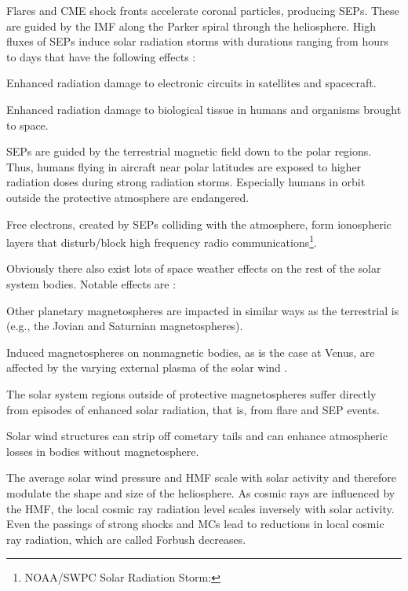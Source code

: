 Flares and CME shock fronts accelerate coronal particles, producing SEPs. These are guided by the IMF along the Parker spiral through the heliosphere. High fluxes of SEPs induce solar radiation storms with durations ranging from hours to days that have the following effects \citep{Bothmer2007}:
\begin{itemize*}
	\item Enhanced radiation damage to electronic circuits in satellites and spacecraft.
	\item Enhanced radiation damage to biological tissue in humans and organisms brought to space.
	\item SEPs are guided by the terrestrial magnetic field down to the polar regions. Thus, humans flying in aircraft near polar latitudes are exposed to higher radiation doses during strong radiation storms. Especially humans in orbit outside the protective atmosphere are endangered.
	\item Free electrons, created by SEPs colliding with the atmosphere, form ionospheric layers that disturb/block high frequency radio communications\footnote{NOAA/SWPC Solar Radiation Storm: }.
\end{itemize*}

Obviously there also exist lots of space weather effects on the rest of the solar system bodies. Notable effects are \citep{Bothmer2007}:
\begin{itemize*}
	\item Other planetary magnetospheres are impacted in similar ways as the terrestrial is (e.g., the Jovian and Saturnian magnetospheres).
	\item Induced magnetospheres on nonmagnetic bodies, as is the case at Venus, are affected by the varying external plasma of the solar wind \citep{Luhmann2004}.
	\item The solar system regions outside of protective magnetospheres suffer directly from episodes of enhanced solar radiation, that is, from flare and SEP events.
	\item Solar wind structures can strip off cometary tails and can enhance atmospheric losses in bodies without magnetosphere.
	\item The average solar wind pressure and HMF scale with solar activity and therefore modulate the shape and size of the heliosphere. As cosmic rays are influenced by the HMF, the local cosmic ray radiation level scales inversely with solar activity. Even the passings of strong shocks and MCs lead to reductions in local cosmic ray radiation, which are called Forbush decreases.
\end{itemize*}

